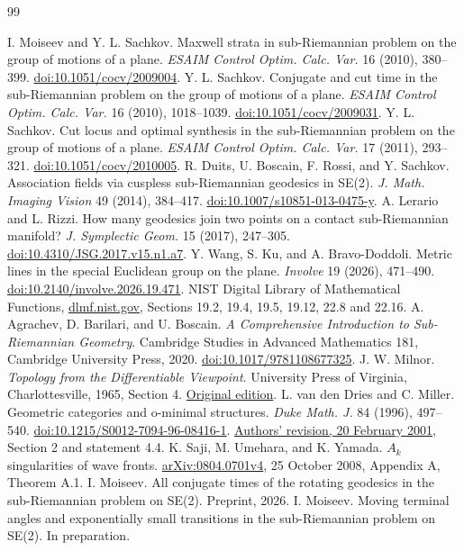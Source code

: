 \documentclass[11pt,a4paper]{article}
\theoremstyle{remark}\newtheorem{remark}[theorem]{Remark}
\begin{document}
\begin{thebibliography}{99}
\raggedright
{} I. Moiseev and Y. L. Sachkov.
Maxwell strata in sub-Riemannian problem on the group of motions of a plane.
\emph{ESAIM Control Optim. Calc. Var.} 16 (2010), 380--399.
\href{https://doi.org/10.1051/cocv/2009004}{doi:10.1051/cocv/2009004}.
 Y. L. Sachkov.
Conjugate and cut time in the sub-Riemannian problem on the group of motions of a plane.
\emph{ESAIM Control Optim. Calc. Var.} 16 (2010), 1018--1039.
\href{https://doi.org/10.1051/cocv/2009031}{doi:10.1051/cocv/2009031}.
 Y. L. Sachkov.
Cut locus and optimal synthesis in the sub-Riemannian problem on the group of motions of a plane.
\emph{ESAIM Control Optim. Calc. Var.} 17 (2011), 293--321.
\href{https://doi.org/10.1051/cocv/2010005}{doi:10.1051/cocv/2010005}.
 R. Duits, U. Boscain, F. Rossi, and Y. Sachkov.
Association fields via cuspless sub-Riemannian geodesics in SE(2).
\emph{J. Math. Imaging Vision} 49 (2014), 384--417.
\href{https://doi.org/10.1007/s10851-013-0475-y}{doi:10.1007/s10851-013-0475-y}.
 A. Lerario and L. Rizzi.
How many geodesics join two points on a contact sub-Riemannian manifold?
\emph{J. Symplectic Geom.} 15 (2017), 247--305.
\href{https://doi.org/10.4310/JSG.2017.v15.n1.a7}{doi:10.4310/JSG.2017.v15.n1.a7}.
 Y. Wang, S. Ku, and A. Bravo-Doddoli.
Metric lines in the special Euclidean group on the plane.
\emph{Involve} 19 (2026), 471--490.
\href{https://doi.org/10.2140/involve.2026.19.471}{doi:10.2140/involve.2026.19.471}.
 NIST Digital Library of Mathematical Functions,
\href{https://dlmf.nist.gov/}{dlmf.nist.gov}, Sections 19.2, 19.4, 19.5,
19.12, 22.8 and 22.16.
 A. Agrachev, D. Barilari, and U. Boscain.
\emph{A Comprehensive Introduction to Sub-Riemannian Geometry}.
Cambridge Studies in Advanced Mathematics 181, Cambridge University
Press, 2020.
\href{https://doi.org/10.1017/9781108677325}{doi:10.1017/9781108677325}.
 J. W. Milnor.
\emph{Topology from the Differentiable Viewpoint}.
University Press of Virginia, Charlottesville, 1965, Section 4.
\href{https://people.dm.unipi.it/benedett/MILNOR-TDVPOINT.pdf}{Original edition}.
 L. van den Dries and C. Miller.
Geometric categories and o-minimal structures.
\emph{Duke Math. J.} 84 (1996), 497--540.
\href{https://doi.org/10.1215/S0012-7094-96-08416-1}{doi:10.1215/S0012-7094-96-08416-1}.
\href{https://people.math.osu.edu/miller.1987/newg.pdf}{Authors' revision,
20 February 2001}, Section 2 and statement 4.4.
 K. Saji, M. Umehara, and K. Yamada.
$A_k$ singularities of wave fronts.
\href{https://arxiv.org/abs/0804.0701v4}{arXiv:0804.0701v4},
25 October 2008, Appendix A, Theorem A.1.
 I. Moiseev.
All conjugate times of the rotating geodesics in the sub-Riemannian problem on SE(2).
Preprint, 2026.
 I. Moiseev.
Moving terminal angles and exponentially small transitions in the sub-Riemannian problem on SE(2).
In preparation.
\end{thebibliography}
\end{document}
